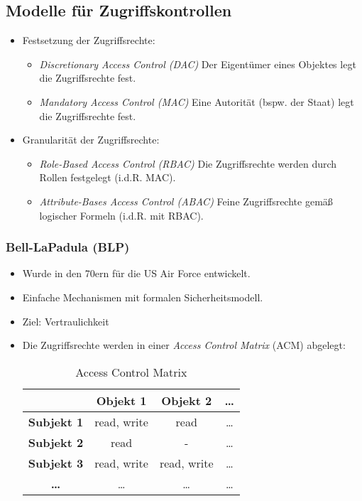 		\subsection{Modelle für Zugriffskontrollen}
			\begin{itemize}
				\item Festsetzung der Zugriffsrechte:
					\begin{itemize}
						\item \textit{Discretionary Access Control (DAC)}    \tabto{4cm} Der Eigentümer eines Objektes legt die Zugriffsrechte fest.
						\item \textit{Mandatory Access Control (MAC)}        \tabto{4cm} Eine Autorität (bspw. der Staat) legt die Zugriffsrechte fest.
					\end{itemize}
				\item Granularität der Zugriffsrechte:
					\begin{itemize}
						\item \textit{Role-Based Access Control (RBAC)}      \tabto{4cm} Die Zugriffsrechte werden durch Rollen festgelegt (i.d.R. MAC).
						\item \textit{Attribute-Bases Access Control (ABAC)} \tabto{4cm} Feine Zugriffsrechte gemäß logischer Formeln (i.d.R. mit RBAC).
					\end{itemize}
			\end{itemize}

			\subsubsection{Bell-LaPadula (BLP)}
				\begin{itemize}
					\item Wurde in den 70ern für die US Air Force entwickelt.
					\item Einfache Mechanismen mit formalen Sicherheitsmodell.
					\item Ziel: Vertraulichkeit
					\item Die Zugriffsrechte werden in einer \textit{Access Control Matrix} (ACM) abgelegt:
						\begin{table}[H]
							\centering
							\begin{tabular}{| c | c | c | c |}
								\hline
								                   & \textbf{Objekt 1} & \textbf{Objekt 2} & \textbf{\dots} \\ \hline
								\textbf{Subjekt 1} & read, write       & read              & \dots          \\ \hline
								\textbf{Subjekt 2} & read              & -                 & \dots          \\ \hline
								\textbf{Subjekt 3} & read, write       & read, write       & \dots          \\ \hline
								\textbf{\dots}     & \dots             & \dots             & \dots          \\ \hline
							\end{tabular}
							\caption{Access Control Matrix}
						\end{table}
				\end{itemize}

